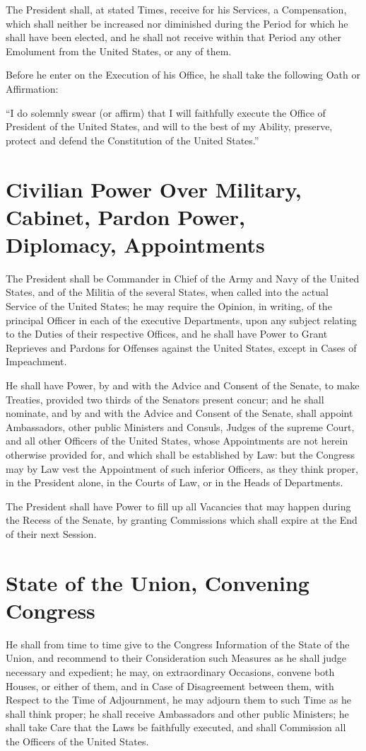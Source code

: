 \documentclass{constitution}
\begin{document}
The President shall, at stated Times,
receive for his Services, a Compensation,
which shall neither be increased nor diminished
during the Period for which he shall have been elected,
and he shall not receive within that Period any other Emolument from the United States,
or any of them.

Before he enter on the Execution of his Office, he shall take the following Oath or Affirmation:

“I do solemnly swear (or affirm)
that I will faithfully execute the Office of President of the United States,
and will to the best of my Ability,
preserve, protect and defend the Constitution of the United States.”

\section{Civilian Power Over Military, Cabinet, Pardon Power, Diplomacy, Appointments}
The President shall be Commander in Chief of the Army and Navy of the United States,
and of the Militia of the several States,
when called into the actual Service of the United States;
he may require the Opinion, in writing,
of the principal Officer in each of the executive Departments,
upon any subject relating to the Duties of their respective Offices,
and he shall have Power to Grant Reprieves and Pardons for Offenses against the United States,
except in Cases of Impeachment.

He shall have Power, by and with the Advice and Consent of the Senate, to make Treaties,
provided two thirds of the Senators present concur;
and he shall nominate,
and by and with the Advice and Consent of the Senate,
shall appoint Ambassadors,
	other public Ministers and Consuls,
	Judges of the supreme Court,
and	all other Officers of the United States,
whose Appointments are not herein otherwise provided for,
and which shall be established by Law:
but the Congress may by Law vest the Appointment of such inferior Officers,
as they think proper,
in the President alone,
	in the Courts of Law,
or	in the Heads of Departments.

The President shall have Power to fill up
all Vacancies that may happen during the Recess of the Senate,
by granting Commissions which shall expire at the End of their next Session.

\section{State of the Union, Convening Congress}
He shall from time to time give to the Congress Information of the State of the Union,
and recommend to their Consideration
such Measures as he shall judge necessary and expedient;
he may, on extraordinary Occasions, convene both Houses, or either of them,
and in Case of Disagreement between them, with Respect to the Time of Adjournment,
he may adjourn them to such Time as he shall think proper;
he shall receive Ambassadors and other public Ministers;
he shall take Care that the Laws be faithfully executed,
and shall Commission all the Officers of the United States.
\end{document}
